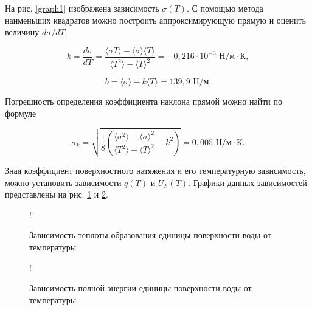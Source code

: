 \documentclass[a4paper,12pt]{article} %
\begin{document}
На рис. \ref{graph1} изображена зависимость $\sigma(T)$. С помощью метода наименьших квадратов можно построить аппроксимирующую прямую и оценить величину $d\sigma/dT$:

\begin{equation}
    k = \frac{d\sigma}{dT} = \frac{\langle \sigma T \rangle - \langle \sigma \rangle \langle T \rangle}{\langle T^2 \rangle - \langle T \rangle^2} = -0,216 \cdot 10^{-3} \text{ Н/м}\cdot\text{К}, 
\end{equation}

\begin{equation}
    b = \langle \sigma \rangle - k\langle T \rangle = 139,9 \text{ Н/м}.
\end{equation}

Погрешность определения коэффициента наклона прямой можно найти по формуле

\begin{equation}
    \sigma_k = \sqrt{\frac{1}{8}(\frac{\langle \sigma^2 \rangle - \langle \sigma \rangle^2}{\langle T^2 \rangle - \langle T \rangle^2} - k^2)} = 0,005 \text{ Н/м}\cdot\text{К}.
\end{equation}

Зная коэффициент поверхностного натяжения и его температурную зависимость, можно установить зависимости $q(T)$ и $U_F(T)$. Графики данных зависимостей представлены на рис. \ref{graph2} и \ref{graph3}.

\begin{figure}
\centering
{} {!} {
}
\caption{Зависимость теплоты образования единицы поверхности воды от температуры}
\label{graph2}
\end{figure}

\begin{figure}
\centering
{} {!} {
}
\caption{Зависимость полной энергии единицы поверхности воды от температуры}
\label{graph3}
\end{figure}
\end{document}
